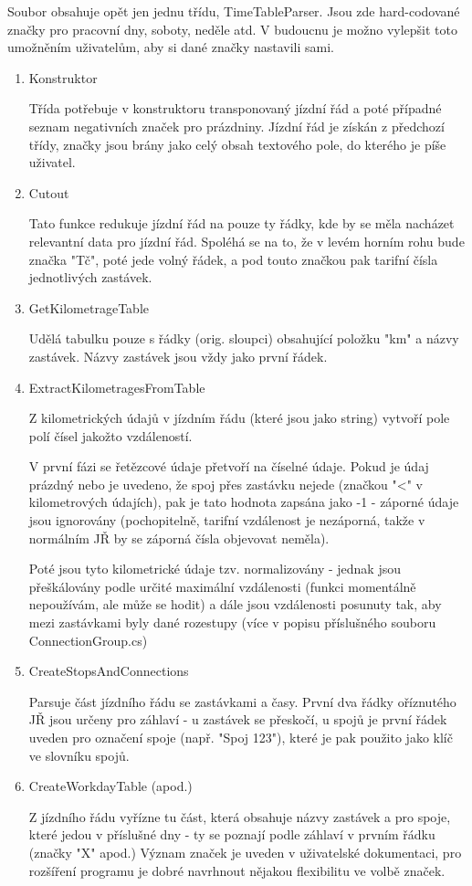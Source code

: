 \documentclass[14pt]{article}
\begin{document}
Soubor obsahuje opět jen jednu třídu, TimeTableParser. Jsou zde hard-codované značky pro pracovní dny, soboty, neděle atd. V budoucnu je možno vylepšit toto umožněním uživatelům, aby si dané značky nastavili sami.

\begin{enumerate}
\item Konstruktor

Třída potřebuje v konstruktoru transponovaný jízdní řád a poté případné seznam negativních značek pro prázdniny. Jízdní řád je získán z předchozí třídy, značky jsou brány jako celý obsah textového pole, do kterého je píše uživatel.

\item Cutout

Tato funkce redukuje jízdní řád na pouze ty řádky, kde by se měla nacházet relevantní data pro jízdní řád. Spoléhá se na to, že v levém horním rohu bude značka "Tč", poté jede volný řádek, a pod touto značkou pak tarifní čísla jednotlivých zastávek. 

\item GetKilometrageTable

Udělá tabulku pouze s řádky (orig. sloupci) obsahující položku "km" a názvy zastávek. Názvy zastávek jsou vždy jako první řádek.

\item ExtractKilometragesFromTable

Z kilometrických údajů v jízdním řádu (které jsou jako string) vytvoří pole polí čísel jakožto vzdáleností.

V první fázi se řetězcové údaje přetvoří na číselné údaje. Pokud je údaj prázdný nebo je uvedeno, že spoj přes zastávku nejede (značkou "<" v kilometrových údajích), pak je tato hodnota zapsána jako -1 - záporné údaje jsou ignorovány (pochopitelně, tarifní vzdálenost je nezáporná, takže v normálním JŘ by se záporná čísla objevovat neměla).

Poté jsou tyto kilometrické údaje tzv. normalizovány - jednak jsou přeškálovány podle určité maximální vzdálenosti (funkci momentálně nepoužívám, ale může se hodit) a dále jsou vzdálenosti posunuty tak, aby mezi zastávkami byly dané rozestupy (více v popisu příslušného souboru ConnectionGroup.cs)

\item CreateStopsAndConnections

Parsuje část jízdního řádu se zastávkami a časy. První dva řádky oříznutého JŘ jsou určeny pro záhlaví - u zastávek se přeskočí, u spojů je první řádek uveden pro označení spoje (např. "Spoj 123"), které je pak použito jako klíč ve slovníku spojů.

\item CreateWorkdayTable (apod.)

Z jízdního řádu vyřízne tu část, která obsahuje názvy zastávek a pro spoje, které jedou v příslušné dny - ty se poznají podle záhlaví v prvním řádku (značky "X" apod.) Význam značek je uveden v uživatelské dokumentaci, pro rozšíření programu je dobré navrhnout nějakou flexibilitu ve volbě značek.

\end{enumerate}
\end{document}
